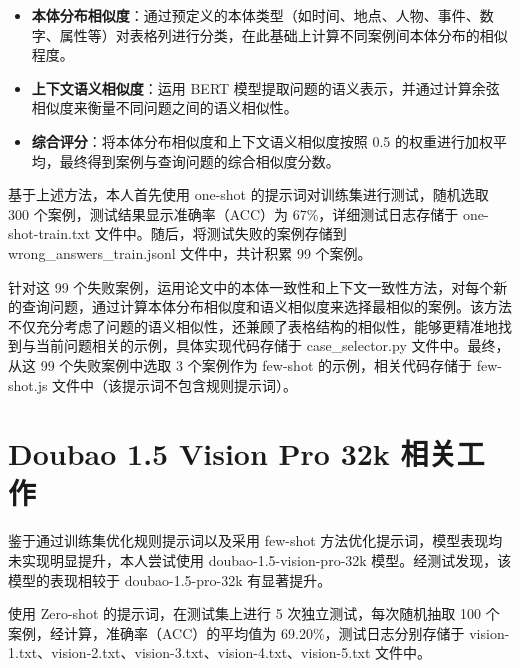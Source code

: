 \documentclass[10.5pt,compsoc]{CjC}
\theoremstyle{mystyle}
\begin{document}
\begin{CJK*}{UTF8}{zhhei}
\begin{itemize}
  \item \textbf{本体分布相似度}：通过预定义的本体类型（如时间、地点、人物、事件、数字、属性等）对表格列进行分类，在此基础上计算不同案例间本体分布的相似程度。
  \item \textbf{上下文语义相似度}：运用 BERT 模型提取问题的语义表示，并通过计算余弦相似度来衡量不同问题之间的语义相似性。
  \item \textbf{综合评分}：将本体分布相似度和上下文语义相似度按照 0.5 的权重进行加权平均，最终得到案例与查询问题的综合相似度分数。
\end{itemize}

基于上述方法，本人首先使用 one-shot 的提示词对训练集进行测试，随机选取 300 个案例，测试结果显示准确率（ACC）为 67\%，详细测试日志存储于 one-shot-train.txt 文件中。随后，将测试失败的案例存储到 wrong\_answers\_train.jsonl 文件中，共计积累 99 个案例。

针对这 99 个失败案例，运用论文中的本体一致性和上下文一致性方法，对每个新的查询问题，通过计算本体分布相似度和语义相似度来选择最相似的案例。该方法不仅充分考虑了问题的语义相似性，还兼顾了表格结构的相似性，能够更精准地找到与当前问题相关的示例，具体实现代码存储于 case\_selector.py 文件中。最终，从这 99 个失败案例中选取 3 个案例作为 few-shot 的示例，相关代码存储于 few-shot.js 文件中（该提示词不包含规则提示词）。

\section{Doubao 1.5 Vision Pro 32k 相关工作}
鉴于通过训练集优化规则提示词以及采用 few-shot 方法优化提示词，模型表现均未实现明显提升，本人尝试使用 doubao-1.5-vision-pro-32k 模型。经测试发现，该模型的表现相较于 doubao-1.5-pro-32k 有显著提升。



使用 Zero-shot 的提示词，在测试集上进行 5 次独立测试，每次随机抽取 100 个案例，经计算，准确率（ACC）的平均值为 69.20\%，测试日志分别存储于 vision-1.txt、vision-2.txt、vision-3.txt、vision-4.txt、vision-5.txt 文件中。


\end{CJK*}
\end{document}

